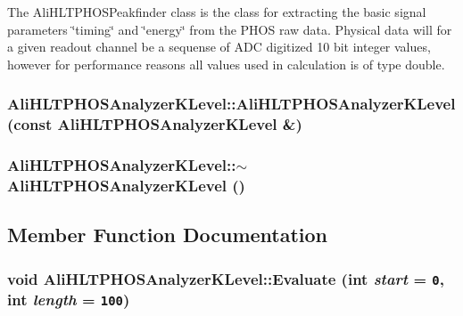 The Ali\-HLTPHOSPeakfinder class is the class for extracting the basic signal parameters \char`\"{}timing\char`\"{} and \char`\"{}energy\char`\"{} from the PHOS raw data. Physical data will for a given readout channel be a sequense of ADC digitized 10 bit integer values, however for performance reasons all values used in calculation is of type double. 
\subsubsection{\setlength{\rightskip}{0pt plus 5cm}Ali\-HLTPHOSAnalyzer\-KLevel::Ali\-HLTPHOSAnalyzer\-KLevel (const {\bf Ali\-HLTPHOSAnalyzer\-KLevel} \&)}\label{classAliHLTPHOSAnalyzerKLevel_a1}


\subsubsection{\setlength{\rightskip}{0pt plus 5cm}Ali\-HLTPHOSAnalyzer\-KLevel::$\sim${\bf Ali\-HLTPHOSAnalyzer\-KLevel} ()\hspace{0.3cm}{\tt  [virtual]}}\label{classAliHLTPHOSAnalyzerKLevel_a3}




\subsection{Member Function Documentation}
\subsubsection{\setlength{\rightskip}{0pt plus 5cm}void Ali\-HLTPHOSAnalyzer\-KLevel::Evaluate (int {\em start} = {\tt 0}, int {\em length} = {\tt 100})\hspace{0.3cm}{\tt  [virtual]}}\label{classAliHLTPHOSAnalyzerKLevel_a4}


